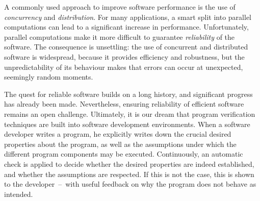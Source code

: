A commonly used approach to improve software performance is the use of \emph{concurrency} and \emph{distribution}.
For many applications, a smart split into parallel computations can lead to a significant increase in performance.
Unfortunately, parallel computations make it more difficult to guarantee \emph{reliability} of the software.
The consequence is unsettling: the use of concurrent and distributed software is widespread, because it provides efficiency and robustness, but the unpredictability of its behaviour makes that errors can occur at unexpected, seemingly random moments. 

The quest for reliable software builds on a long history, and significant progress has already been made. Nevertheless, ensuring reliability of efficient software remains an open challenge. Ultimately, it is our dream that program verification techniques are built into software development environments. When a software developer writes a program, he explicitly writes down the crucial  desired properties about the program, as well as the assumptions under which the different program components may be executed. Continuously, an automatic check is applied to decide whether the desired properties are indeed established, and whether the assumptions are respected. If this is not the case, this is shown to the developer~--~with useful feedback on why the program does not behave as intended. 





